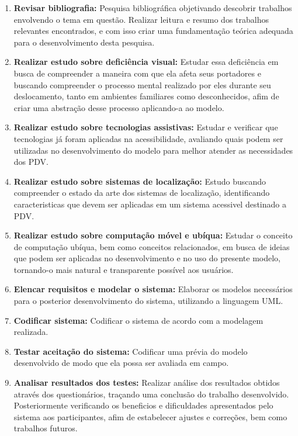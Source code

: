 \documentclass[english,brazilian]{UNISINOSmonografia}
\begin{document}
\begin{enumerate}
	\item \textbf{Revisar bibliografia:} Pesquisa bibliográfica objetivando descobrir trabalhos envolvendo o tema em questão. Realizar leitura e resumo dos trabalhos relevantes encontrados, e com isso criar uma fundamentação teórica adequada para o desenvolvimento desta pesquisa.
    \item \textbf{Realizar estudo sobre deficiência visual:} Estudar essa deficiência em busca de compreender a maneira com que ela afeta seus portadores e buscando compreender o processo mental realizado por eles durante seu deslocamento, tanto em ambientes familiares como desconhecidos, afim de criar uma abstração desse processo aplicando-a ao modelo.
    \item \textbf{Realizar estudo sobre tecnologias assistivas:} Estudar e verificar que tecnologias já foram aplicadas na acessibilidade, avaliando quais podem ser utilizadas no desenvolvimento do modelo para melhor atender as necessidades dos PDV.
    \item \textbf{Realizar estudo sobre sistemas de localização:} Estudo buscando compreender o estado da arte dos sistemas de localização, identificando caracteristicas que devem ser aplicadas em um sistema acessivel destinado a PDV.
    \item \textbf{Realizar estudo sobre computação móvel e ubíqua:} Estudar o conceito de computação ubíqua, bem como conceitos relacionados, em busca de ideias que podem ser aplicadas no desenvolvimento e no uso do presente modelo, tornando-o mais natural e transparente possível aos usuários.
    \item \textbf{Elencar requisitos e modelar o sistema:} Elaborar os modelos necessários para o posterior desenvolvimento do sistema, utilizando a linguagem UML.
    \item \textbf{Codificar sistema:} Codificar o sistema de acordo com a modelagem realizada.
	\item \textbf{Testar aceitação do sistema:} Codificar uma prévia do modelo desenvolvido de modo que ela possa ser avaliada em campo.
	\item \textbf{Analisar resultados dos testes:} Realizar análise dos resultados obtidos através dos questionários, traçando uma conclusão do trabalho desenvolvido. Posteriormente verificando os beneficios e dificuldades apresentados pelo sistema aos participantes, afim de estabelecer ajustes e correções, bem como trabalhos futuros.
\end{enumerate}
\end{document}
